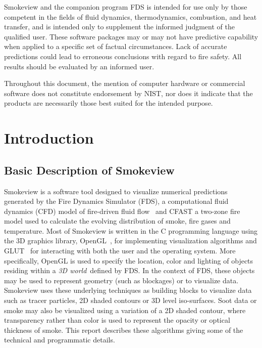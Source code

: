 \documentclass[11pt,twoside]{book}
\begin{document}
Smokeview and the companion program FDS is intended for use only
by those competent in the fields of fluid dynamics,
thermodynamics, combustion, and heat transfer, and is intended
only to supplement the informed judgment of the qualified user.
These software packages may or may not have predictive capability
when applied to a specific set of factual circumstances. Lack of
accurate predictions could lead to erroneous conclusions with
regard to fire safety. All results should be evaluated by an
informed user.

Throughout this document, the mention of computer hardware or
commercial software does not constitute endorsement by NIST, nor
does it indicate that the products are necessarily those best
suited for the intended purpose.

%
%



\cleardoublepage
\tableofcontents

\cleardoublepage
\listoffigures

\mainmatter


%
%

\chapter{Introduction}
\section{Basic Description of Smokeview}
Smokeview is a software tool designed to visualize numerical
predictions generated by the Fire Dynamics Simulator (FDS), a
computational fluid dynamics (CFD) model of fire-driven fluid
flow~\cite{FDS_Tech_Guide,FDS_Users_Guide} and CFAST a two-zone
fire model\cite{CFAST_Tech_Guide_7} used to calculate the evolving
distribution of smoke, fire gases and temperature. Most of
Smokeview is written in the C programming language using the 3D
graphics library, OpenGL~\cite{OpenGLRed}, for implementing
visualization algorithms and GLUT~\cite{OpenGLGlut} for
interacting with both the user and the operating system. More
specifically, OpenGL is used to specify the location, color and
lighting of objects residing within a {\em 3D world}\ defined by
FDS. In the context of FDS, these objects may be used to represent
geometry (such as blockages) or to visualize data. Smokeview uses
these underlying techniques as building blocks to visualize data
such as tracer particles, 2D shaded contours or 3D level
iso-surfaces.  Soot data or smoke may also be visualized using a
variation of a 2D shaded contour, where transparency rather than
color is used to represent the opacity or optical thickness of
smoke. This report describes these algorithms giving some of the
technical and programmatic details.
\end{document}
